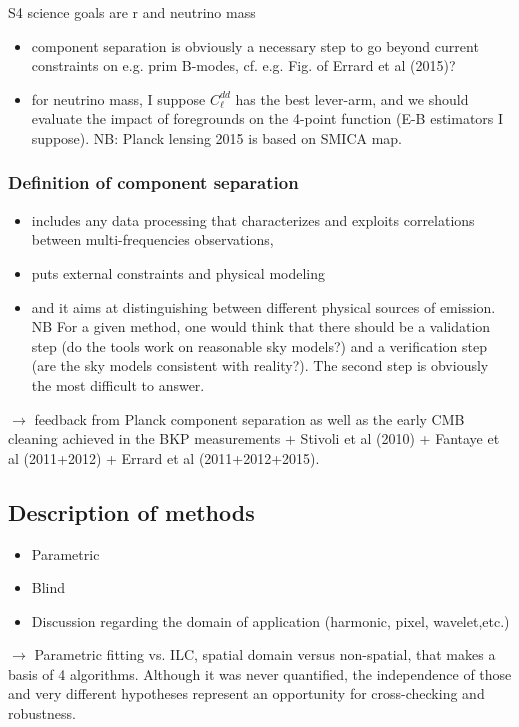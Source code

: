 S4 science goals are r and neutrino mass
\begin{itemize}
	\item component separation is obviously a necessary step to go beyond current constraints on e.g. prim B-modes, cf. e.g. Fig.  of Errard et al (2015)?
	\item for neutrino mass, I suppose $C_\ell^{dd}$ has the best lever-arm, and we should evaluate the impact of foregrounds on the 4-point function (E-B estimators I suppose). NB: Planck lensing 2015 is based on SMICA map.
\end{itemize}

\subsubsection{Definition of component separation}
\begin{itemize}
	\item includes any data processing that characterizes and exploits correlations between multi-frequencies observations,
	\item puts external constraints and physical modeling
	\item and it aims at distinguishing between different physical sources of emission.
	NB For a given method, one would think that there should be a validation step (do the tools work on reasonable sky models?) and a verification step (are the sky models consistent with reality?). The second step is obviously the most difficult to answer.
\end{itemize}

$\rightarrow$ feedback from Planck component separation as well as the early CMB cleaning achieved in the BKP measurements + Stivoli et al (2010) + Fantaye et al (2011+2012) + Errard et al (2011+2012+2015).

\subsection{Description of methods}
\begin{itemize}
	\item Parametric
	\item Blind
	\item Discussion regarding the domain of application (harmonic, pixel, wavelet,etc.)
\end{itemize}

$\rightarrow$ Parametric fitting vs. ILC, spatial domain versus
non-spatial, that makes a basis of 4 algorithms. Although it was never
quantified, the independence of those and very different hypotheses represent
an opportunity for cross-checking and robustness.

